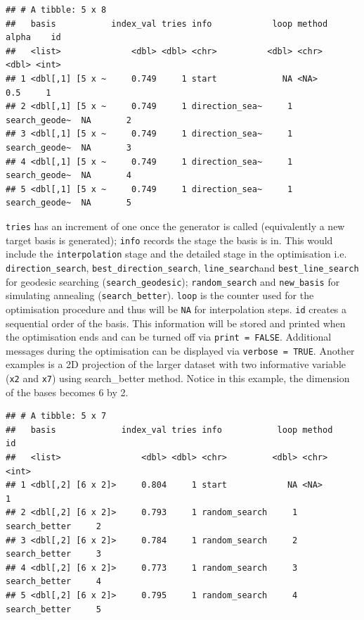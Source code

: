 \documentclass[12pt]{article}
\newenvironment{Shaded}{\begin{snugshade}}{\end{snugshade}}
\newcommand{\DecValTok}[1]{\textcolor[rgb]{0.00,0.00,0.81}{#1}}
\newcommand{\KeywordTok}[1]{\textcolor[rgb]{0.13,0.29,0.53}{\textbf{#1}}}
\newcommand{\NormalTok}[1]{#1}
\newcommand{\OperatorTok}[1]{\textcolor[rgb]{0.81,0.36,0.00}{\textbf{#1}}}
\newcommand{\StringTok}[1]{\textcolor[rgb]{0.31,0.60,0.02}{#1}}
\begin{document}
\begin{verbatim}
## # A tibble: 5 x 8
##   basis           index_val tries info            loop method        alpha    id
##   <list>              <dbl> <dbl> <chr>          <dbl> <chr>         <dbl> <int>
## 1 <dbl[,1] [5 x ~     0.749     1 start             NA <NA>            0.5     1
## 2 <dbl[,1] [5 x ~     0.749     1 direction_sea~     1 search_geode~  NA       2
## 3 <dbl[,1] [5 x ~     0.749     1 direction_sea~     1 search_geode~  NA       3
## 4 <dbl[,1] [5 x ~     0.749     1 direction_sea~     1 search_geode~  NA       4
## 5 <dbl[,1] [5 x ~     0.749     1 direction_sea~     1 search_geode~  NA       5
\end{verbatim}

\texttt{tries} has an increment of one once the generator is called
(equivalently a new target basis is generated); \texttt{info} records
the stage the basis is in. This would include the \texttt{interpolation}
stage and the detailed stage in the optimisation i.e.
\texttt{direction\_search}, \texttt{best\_direction\_search},
\texttt{line\_search}and \texttt{best\_line\_search} for geodesic
searching (\texttt{search\_geodesic}); \texttt{random\_search} and
\texttt{new\_basis} for simulating annealing (\texttt{search\_better}).
\texttt{loop} is the counter used for the optimisation procedure and
thus will be \texttt{NA} for interpolation steps. \texttt{id} creates a
sequential order of the basis. This information will be stored and
printed when the optimisation ends and can be turned off via
\texttt{print\ =\ FALSE}. Additional messages during the optimisation
can be displayed via \texttt{verbose\ =\ TRUE}. Another examples is a 2D
projection of the larger dataset with two informative variable
(\texttt{x2} and \texttt{x7}) using search\_better method. Notice in
this example, the dimension of the bases becomes 6 by 2.

\begin{Shaded}
\end{Shaded}

\begin{verbatim}
## # A tibble: 5 x 7
##   basis             index_val tries info           loop method           id
##   <list>                <dbl> <dbl> <chr>         <dbl> <chr>         <int>
## 1 <dbl[,2] [6 x 2]>     0.804     1 start            NA <NA>              1
## 2 <dbl[,2] [6 x 2]>     0.793     1 random_search     1 search_better     2
## 3 <dbl[,2] [6 x 2]>     0.784     1 random_search     2 search_better     3
## 4 <dbl[,2] [6 x 2]>     0.773     1 random_search     3 search_better     4
## 5 <dbl[,2] [6 x 2]>     0.795     1 random_search     4 search_better     5
\end{verbatim}
\end{document}
